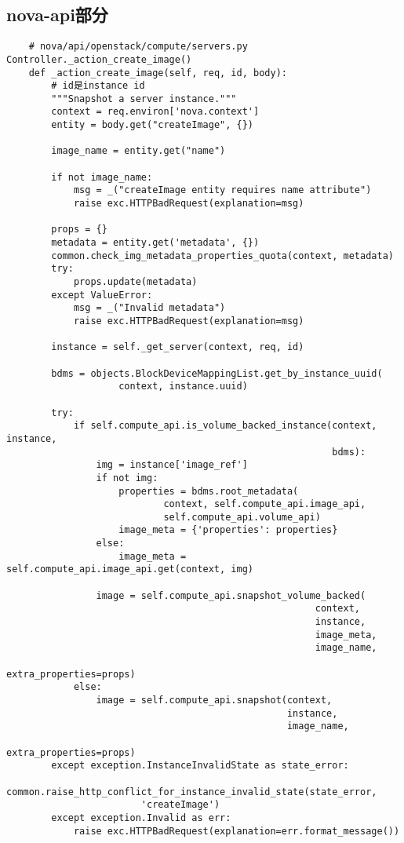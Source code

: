 \documentclass[a4paper,left=1.5cm,right=1.5cm,11pt]{article}
\begin{document}
\subsection{nova-api部分}
    \begin{lstlisting}
    # nova/api/openstack/compute/servers.py Controller._action_create_image()
    def _action_create_image(self, req, id, body):
        # id是instance id
        """Snapshot a server instance."""
        context = req.environ['nova.context']
        entity = body.get("createImage", {})

        image_name = entity.get("name")

        if not image_name:
            msg = _("createImage entity requires name attribute")
            raise exc.HTTPBadRequest(explanation=msg)

        props = {}
        metadata = entity.get('metadata', {})
        common.check_img_metadata_properties_quota(context, metadata)
        try:
            props.update(metadata)
        except ValueError:
            msg = _("Invalid metadata")
            raise exc.HTTPBadRequest(explanation=msg)

        instance = self._get_server(context, req, id)

        bdms = objects.BlockDeviceMappingList.get_by_instance_uuid(
                    context, instance.uuid)

        try:
            if self.compute_api.is_volume_backed_instance(context, instance,
                                                          bdms):
                img = instance['image_ref']
                if not img:
                    properties = bdms.root_metadata(
                            context, self.compute_api.image_api,
                            self.compute_api.volume_api)
                    image_meta = {'properties': properties}
                else:
                    image_meta = self.compute_api.image_api.get(context, img)

                image = self.compute_api.snapshot_volume_backed(
                                                       context,
                                                       instance,
                                                       image_meta,
                                                       image_name,
                                                       extra_properties=props)
            else:
                image = self.compute_api.snapshot(context,
                                                  instance,
                                                  image_name,
                                                  extra_properties=props)
        except exception.InstanceInvalidState as state_error:
            common.raise_http_conflict_for_instance_invalid_state(state_error,
                        'createImage')
        except exception.Invalid as err:
            raise exc.HTTPBadRequest(explanation=err.format_message())


\end{lstlisting}
\end{document}
